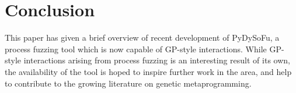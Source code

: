 \documentclass[draft,12pt]{llncs}   %
\begin{document}
\section{Conclusion}
This paper has given a brief overview of recent development of PyDySoFu, a
process fuzzing tool which is now capable of GP-style interactions. While
GP-style interactions arising from process fuzzing is an interesting result of
its own, the availability of the tool is hoped to inspire further work in the
area, and help to contribute to the growing literature on genetic
metaprogramming.\par



\end{document}
